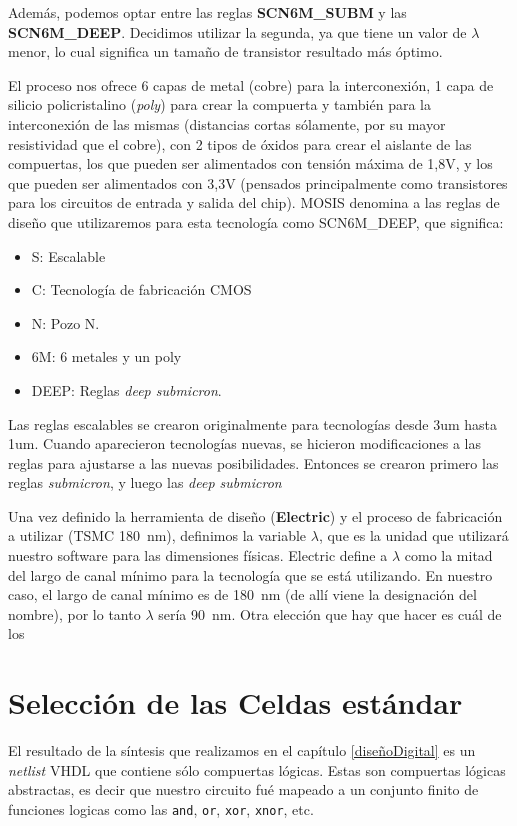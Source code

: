 Además, podemos optar entre las reglas \textbf{SCN6M\_SUBM} y las \textbf{SCN6M\_DEEP}. Decidimos utilizar la segunda, ya que tiene un valor de $\lambda$ menor, lo cual significa un tamaño de transistor resultado más óptimo.

El proceso nos ofrece 6 capas de metal (cobre) para la interconexión, 1 capa de silicio policristalino (\emph{poly}) para crear la compuerta y también para la interconexión de las mismas (distancias cortas sólamente, por su mayor resistividad que el cobre), con 2 tipos de óxidos para crear el aislante de las compuertas, los que pueden ser alimentados con tensión máxima de 1,8V, y los que pueden ser alimentados con 3,3V (pensados principalmente como transistores para los circuitos de entrada y salida del chip). MOSIS denomina a las reglas de diseño que utilizaremos para esta tecnología como SCN6M\_DEEP, que significa: 
\begin{itemize}
\item S: Escalable
\item C: Tecnología de fabricación CMOS
\item N: Pozo N.
\item 6M: 6 metales y un poly
\item DEEP: Reglas \emph{deep submicron}.
\end{itemize}
Las reglas escalables se crearon originalmente para tecnologías desde 3um hasta 1um. Cuando aparecieron tecnologías nuevas, se hicieron modificaciones a las reglas para ajustarse a las nuevas posibilidades. Entonces se crearon primero las reglas \emph{submicron}, y luego las \emph{deep submicron}

Una vez definido la herramienta de diseño (\textbf{Electric}) y el proceso de fabricación a utilizar (TSMC 180~nm), definimos la variable $\lambda$, que es la unidad que utilizará nuestro software para las dimensiones físicas. Electric define a $\lambda$ como la mitad del largo de canal mínimo para la tecnología que se está utilizando. En nuestro caso, el largo de canal mínimo es de 180~nm (de allí viene la designación del nombre), por lo tanto $\lambda $ sería 90~nm. Otra elección que hay que hacer es cuál de los 

\section{Selección de las Celdas estándar}\label{celdasEstandars}
El resultado de la síntesis que realizamos en el capítulo \ref{diseñoDigital} es un \emph{netlist} VHDL que contiene sólo compuertas lógicas. Estas son compuertas lógicas abstractas, es decir que nuestro circuito fué mapeado a un conjunto finito de funciones logicas como las \verb.and., \verb.or., \verb.xor., \verb.xnor., etc.

